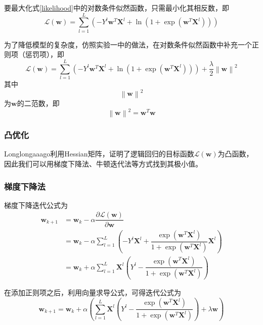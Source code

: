 要最大化式\ref{likelihood}中的对数条件似然函数，只需最小化其相反数，即
\begin{equation}
    \mathcal{L} (\mathbf{w})=\sum^L_{l=1}\left(-Y^l\mathbf{w}^T\mathbf{X}^l+\ln\left(1+\exp\left(\mathbf{w}^T\mathbf{X}^l\right)\right)\right)
\end{equation}

为了降低模型的复杂度，仿照实验一中的做法，在对数条件似然函数中补充一个正则项（惩罚项），即
\begin{equation}
    \mathcal{L} (\mathbf{w})=\sum^L_{l=1}\left(-Y^l\mathbf{w}^T\mathbf{X}^l+\ln\left(1+\exp\left(\mathbf{w}^T\mathbf{X}^l\right)\right)\right)+\dfrac{\lambda}{2}\left\lVert \mathbf{w}\right\rVert ^2
\end{equation}
其中
\begin{equation}
    \left\lVert \mathbf{w}\right\rVert ^2 
\end{equation}
为$\mathbf{w}$的二范数，即
\begin{equation}
    \left\lVert \mathbf{w}\right\rVert ^2=\mathbf{w}^T\mathbf{w}
\end{equation}

\subsubsection{凸优化}

Longlongaaago\cite{tu}利用Hessian矩阵，证明了逻辑回归的目标函数$\mathcal{L} (\mathbf{w})$为凸函数，因此我们可以用梯度下降法、牛顿迭代法等方式找到其极小值。

\subsubsection{梯度下降法}

梯度下降迭代公式为
\begin{align}
    \mathbf{w}_{k+1}
    &= \mathbf{w}_k-\alpha\dfrac{\partial\mathcal{L}(\mathbf{w})}{\partial\mathbf{w}} \\
    &= \mathbf{w}_k-\alpha\sum^L_{l=1}\left(-Y^l\mathbf{X}^l+\dfrac{\exp\left(\mathbf{w}^T\mathbf{X}^l\right)}{1+\exp\left(\mathbf{w}^T\mathbf{X}^l\right)}\mathbf{X}^l\right) \\
    &= \mathbf{w}_k+\alpha\sum^L_{l=1}\mathbf{X}^l\left(Y^l-\dfrac{\exp\left(\mathbf{w}^T\mathbf{X}^l\right)}{1+\exp\left(\mathbf{w}^T\mathbf{X}^l\right)}\right)
\end{align}

在添加正则项之后，利用向量求导公式\cite{dvec}，可得迭代公式为
\begin{equation}
    \mathbf{w}_{k+1}=\mathbf{w}_k+\alpha\left(\sum^L_{l=1}\mathbf{X}^l\left(Y^l-\dfrac{\exp\left(\mathbf{w}^T\mathbf{X}^l\right)}{1+\exp\left(\mathbf{w}^T\mathbf{X}^l\right)}\right)+\lambda\mathbf{w}\right)
\end{equation}


